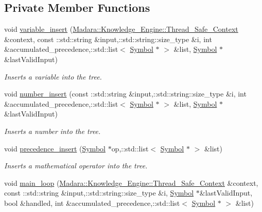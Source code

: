 \subsection*{Private Member Functions}
\begin{DoxyCompactItemize}
\item 
void \hyperlink{classMadara_1_1Expression__Tree_1_1Interpreter_a037d17bea69e32bc7a9df8c8276eff16}{variable\_\-insert} (\hyperlink{classMadara_1_1Knowledge__Engine_1_1Thread__Safe__Context}{Madara::Knowledge\_\-Engine::Thread\_\-Safe\_\-Context} \&context, const ::std::string \&input,::std::string::size\_\-type \&i, int \&accumulated\_\-precedence,::std::list$<$ \hyperlink{classMadara_1_1Expression__Tree_1_1Symbol}{Symbol} $\ast$ $>$ \&list, \hyperlink{classMadara_1_1Expression__Tree_1_1Symbol}{Symbol} $\ast$\&lastValidInput)
\begin{DoxyCompactList}\small\item\em Inserts a variable into the tree. \item\end{DoxyCompactList}\item 
void \hyperlink{classMadara_1_1Expression__Tree_1_1Interpreter_af3674e6bfbc4bceee7fccd3fc0e24f9d}{number\_\-insert} (const ::std::string \&input,::std::string::size\_\-type \&i, int \&accumulated\_\-precedence,::std::list$<$ \hyperlink{classMadara_1_1Expression__Tree_1_1Symbol}{Symbol} $\ast$ $>$ \&list, \hyperlink{classMadara_1_1Expression__Tree_1_1Symbol}{Symbol} $\ast$\&lastValidInput)
\begin{DoxyCompactList}\small\item\em Inserts a number into the tree. \item\end{DoxyCompactList}\item 
void \hyperlink{classMadara_1_1Expression__Tree_1_1Interpreter_a108b0d749a1a59b81368649ec49e7b34}{precedence\_\-insert} (\hyperlink{classMadara_1_1Expression__Tree_1_1Symbol}{Symbol} $\ast$op,::std::list$<$ \hyperlink{classMadara_1_1Expression__Tree_1_1Symbol}{Symbol} $\ast$ $>$ \&list)
\begin{DoxyCompactList}\small\item\em Inserts a mathematical operator into the tree. \item\end{DoxyCompactList}\item 
void \hyperlink{classMadara_1_1Expression__Tree_1_1Interpreter_a29620dec1b21edf41a8ec8542b27462a}{main\_\-loop} (\hyperlink{classMadara_1_1Knowledge__Engine_1_1Thread__Safe__Context}{Madara::Knowledge\_\-Engine::Thread\_\-Safe\_\-Context} \&context, const ::std::string \&input,::std::string::size\_\-type \&i, \hyperlink{classMadara_1_1Expression__Tree_1_1Symbol}{Symbol} $\ast$\&lastValidInput, bool \&handled, int \&accumulated\_\-precedence,::std::list$<$ \hyperlink{classMadara_1_1Expression__Tree_1_1Symbol}{Symbol} $\ast$ $>$ \&list)

\end{DoxyCompactItemize}
